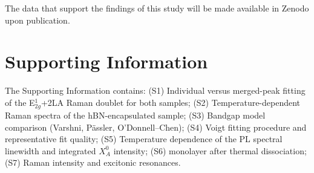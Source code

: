 \documentclass[letterpaper]{article}
\DeclareRobustCommand{\rev}[1]{#1}
\begin{document}
The data that support the findings of this study will be made available in
Zenodo upon publication.

\section*{Supporting Information}

The Supporting Information contains: (S1) Individual versus merged-peak
fitting of the E$^1_{2g}$+2LA Raman doublet for both samples; (S2)
Temperature-dependent Raman spectra of the hBN-encapsulated sample; (S3)
Bandgap model comparison (Varshni, Pässler, O'Donnell--Chen); (S4) Voigt fitting procedure and representative fit quality; (S5)
Temperature dependence of the PL spectral linewidth and integrated $X_A^0$
intensity; (S6)  monolayer after thermal
dissociation\rev{; (S7) Raman intensity and excitonic resonances}.

\printbibliography
\end{document}
